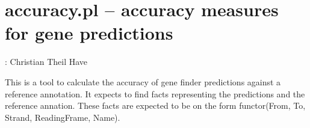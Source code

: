 


\section{accuracy.pl -- accuracy measures for gene predictions}

\label{sec:accuracy}

\begin{tags}
: Christian Theil Have
\end{tags}

This is a tool to calculate the accuracy of gene finder predictions
against a reference annotation. It expects to find facts representing
the predictions and the reference annation. These facts are expected
to be on the form functor(From, To, Strand, ReadingFrame, Name).\vspace{0.7cm}

